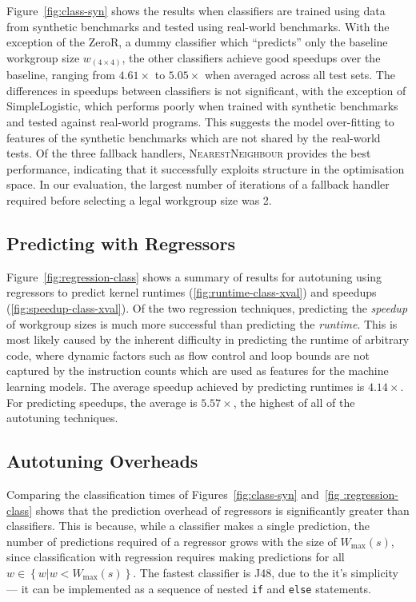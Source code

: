 \documentclass[preprint,nonatbib,10pt,nocopyrightspace]{sigplanconf}
\begin{document}
  Figure~\ref{fig:class-syn} shows the results when classifiers are trained using
  data from synthetic benchmarks and tested using real-world benchmarks. With the
  exception of the ZeroR, a dummy classifier which ``predicts'' only the baseline
  workgroup size $w_{\left( 4 \times 4 \right)}$, the other classifiers achieve
  good speedups over the baseline, ranging from $4.61\times$ to $5.05\times$ when
  averaged across all test sets. The differences in speedups between classifiers
  is not significant, with the exception of SimpleLogistic, which performs poorly
  when trained with synthetic benchmarks and tested against real-world programs.
  This suggests the model over-fitting to features of the synthetic benchmarks
  which are not shared by the real-world tests. Of the three fallback handlers,
  \textsc{NearestNeighbour} provides the best performance, indicating
  that it successfully exploits structure in the optimisation space. In
  our evaluation, the largest number of iterations of a fallback handler
  required before selecting a legal workgroup size was 2.


  \subsection{Predicting with Regressors}

  Figure~\ref{fig:regression-class} shows a summary of results for autotuning
  using regressors to predict kernel runtimes (\ref{fig:runtime-class-xval}) and
  speedups (\ref{fig:speedup-class-xval}). Of the two regression techniques,
  predicting the \emph{speedup} of workgroup sizes is much more successful than
  predicting the \emph{runtime}. This is most likely caused by the inherent
  difficulty in predicting the runtime of arbitrary code, where dynamic factors
  such as flow control and loop bounds are not captured by the instruction counts
  which are used as features for the machine learning models. The average speedup
  achieved by predicting runtimes is $4.14\times$. For predicting speedups, the
  average is $5.57\times$, the highest of all of the autotuning techniques.

  \subsection{Autotuning Overheads}

  Comparing the classification times of Figures~\ref{fig:class-syn} and~\ref{fig
  :regression-class} shows that the prediction overhead of regressors is
  significantly greater than classifiers. This is because, while a classifier
  makes a single prediction, the number of predictions required of a regressor
  grows with the size of $W_{\max}(s)$, since classification with regression
  requires making predictions for all $w \in \left\{ w | w < W_{\max}(s)
  \right\}$. The fastest classifier is J48, due to the it's simplicity --- it can
  be implemented as a sequence of nested \texttt{if} and \texttt{else} statements.
\end{document}
